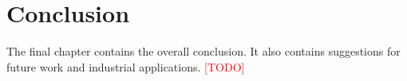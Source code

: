 \chapter{Conclusion}
\label{cha:conclusion}
The final chapter contains the overall conclusion. It also contains
suggestions for future work and industrial applications.
\textcolor{red}{[TODO]}

